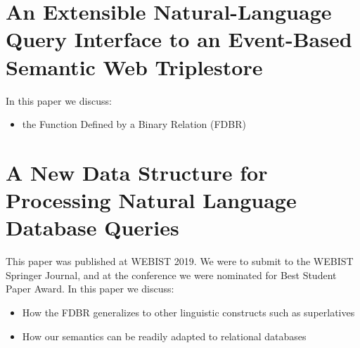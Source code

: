 \documentclass[../main.tex]{subfiles}
\begin{document}
\begin{refsection}
%


\section{An Extensible Natural-Language Query Interface to an Event-Based Semantic Web Triplestore}

In this paper we discuss:

\begin{itemize}
    \item the Function Defined by a Binary Relation (FDBR)
\end{itemize}


\section{A New Data Structure for Processing Natural Language Database Queries}


This paper was published at WEBIST 2019.  We were to submit to the WEBIST Springer Journal, and at the conference we were nominated for Best Student Paper Award.  In this paper we discuss:

\begin{itemize}
    \item How the FDBR generalizes to other linguistic constructs such as superlatives
    \item How our semantics can be readily adapted to relational databases
\end{itemize}


\end{refsection}
\end{document}
